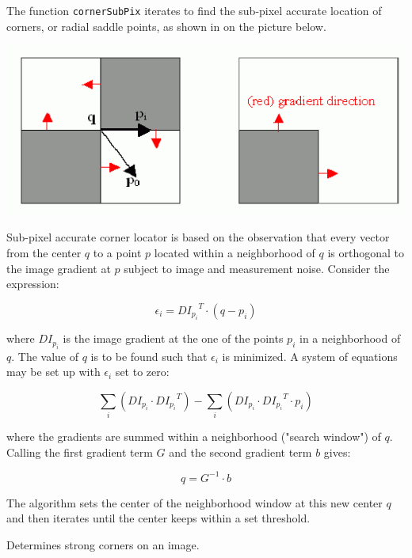 The function \texttt{cornerSubPix} iterates to find the sub-pixel accurate location of corners, or radial saddle points, as shown in on the picture below.

\includegraphics[width=1.0\textwidth]{pics/cornersubpix.png}

Sub-pixel accurate corner locator is based on the observation that every vector from the center $q$ to a point $p$ located within a neighborhood of $q$ is orthogonal to the image gradient at $p$ subject to image and measurement noise. Consider the expression:

\[
\epsilon_i = {DI_{p_i}}^T \cdot (q - p_i)
\]

where ${DI_{p_i}}$ is the image gradient at the one of the points $p_i$ in a neighborhood of $q$. The value of $q$ is to be found such that $\epsilon_i$ is minimized. A system of equations may be set up with $\epsilon_i$ set to zero:

\[
\sum_i(DI_{p_i} \cdot {DI_{p_i}}^T) - \sum_i(DI_{p_i} \cdot {DI_{p_i}}^T \cdot p_i)
\]

where the gradients are summed within a neighborhood ("search window") of $q$. Calling the first gradient term $G$ and the second gradient term $b$ gives:

\[
q = G^{-1} \cdot b
\]

The algorithm sets the center of the neighborhood window at this new center $q$ and then iterates until the center keeps within a set threshold.


\label{goodFeaturesToTrack}
Determines strong corners on an image.

